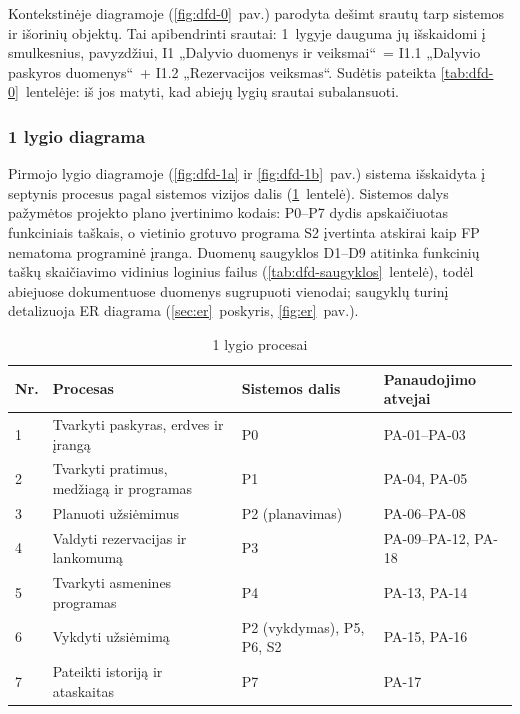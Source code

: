 Kontekstinėje diagramoje (\ref{fig:dfd-0}~pav.) parodyta dešimt srautų tarp
sistemos ir išorinių objektų. Tai apibendrinti srautai: 1~lygyje dauguma jų
išskaidomi į smulkesnius, pavyzdžiui, I1 „Dalyvio duomenys ir
veiksmai“~= I1.1 „Dalyvio paskyros duomenys“~+ I1.2 „Rezervacijos veiksmas“.
Sudėtis pateikta \ref{tab:dfd-0}~lentelėje: iš jos matyti, kad abiejų lygių
srautai subalansuoti.

\subsubsection{1 lygio diagrama}\label{sec:dfd-1}

Pirmojo lygio diagramoje (\ref{fig:dfd-1a} ir \ref{fig:dfd-1b}~pav.) sistema
išskaidyta į septynis procesus pagal sistemos vizijos dalis
(\ref{tab:dfd-procesai}~lentelė). Sistemos dalys pažymėtos projekto plano
įvertinimo kodais: P0--P7 dydis apskaičiuotas funkciniais taškais, o vietinio
grotuvo programa S2 įvertinta atskirai kaip FP nematoma programinė įranga. Duomenų saugyklos D1--D9 atitinka
funkcinių taškų skaičiavimo vidinius loginius failus
(\ref{tab:dfd-saugyklos}~lentelė), todėl abiejuose dokumentuose duomenys
sugrupuoti vienodai; saugyklų turinį detalizuoja ER diagrama (\ref{sec:er}~poskyris, \ref{fig:er}~pav.).

\begin{table}[H]
\centering
\caption{1 lygio procesai}\label{tab:dfd-procesai}
\small
\begin{tabular}{@{}l>{\raggedright\arraybackslash}p{6.2cm}>{\raggedright\arraybackslash}p{3.2cm}>{\raggedright\arraybackslash}p{3.6cm}@{}}
\toprule
\textbf{Nr.} & \textbf{Procesas} & \textbf{Sistemos dalis} & \textbf{Panaudojimo atvejai} \\
\midrule
1 & Tvarkyti paskyras, erdves ir įrangą & P0 & PA-01--PA-03 \\
2 & Tvarkyti pratimus, medžiagą ir programas & P1 & PA-04, PA-05 \\
3 & Planuoti užsiėmimus & P2 (planavimas) & PA-06--PA-08 \\
4 & Valdyti rezervacijas ir lankomumą & P3 & PA-09--PA-12, PA-18 \\
5 & Tvarkyti asmenines programas & P4 & PA-13, PA-14 \\
6 & Vykdyti užsiėmimą & P2 (vykdymas), P5, P6, S2 & PA-15, PA-16 \\
7 & Pateikti istoriją ir ataskaitas & P7 & PA-17 \\
\bottomrule
\end{tabular}
\end{table}

